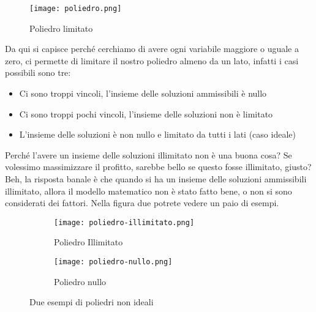 \documentclass{article}
\begin{document}
    \begin{figure}[t]
        \centering
        \texttt{[image: poliedro.png]}
        \caption{Poliedro limitato}
        
    \end{figure}
    Da qui si capisce perché cerchiamo di avere ogni variabile maggiore o uguale a zero, ci permette di limitare il nostro poliedro almeno da un lato, infatti i casi possibili sono tre:
    \begin{itemize}
        \item Ci sono troppi vincoli, l'insieme delle soluzioni ammissibili è nullo
        \item Ci sono troppi pochi vincoli, l'insieme delle soluzioni non è limitato
        \item L'insieme delle soluzioni è non nullo e limitato da tutti i lati (caso ideale)
    \end{itemize}
    Perché l'avere un insieme delle soluzioni illimitato non è una buona cosa? Se volessimo massimizzare il profitto, sarebbe bello se questo fosse illimitato, giusto? Beh, la risposta banale è che quando si ha un insieme delle soluzioni ammissibili illimitato, allora il modello matematico non è stato fatto bene, o non si sono considerati dei fattori.
    Nella figura due potrete vedere un paio di esempi.
    \begin{figure}[t!]

    \begin{subfigure}{0.5\textwidth}
    \texttt{[image: poliedro-illimitato.png]} 
    \caption{Poliedro Illimitato}
    
    \end{subfigure}
    \begin{subfigure}{0.5\textwidth}
    \texttt{[image: poliedro-nullo.png]}
    \caption{Poliedro nullo}
    
    \end{subfigure}
    
    \caption{Due esempi di poliedri non ideali}
    \label{fig:image2}
    \end{figure}
    
\end{document}
